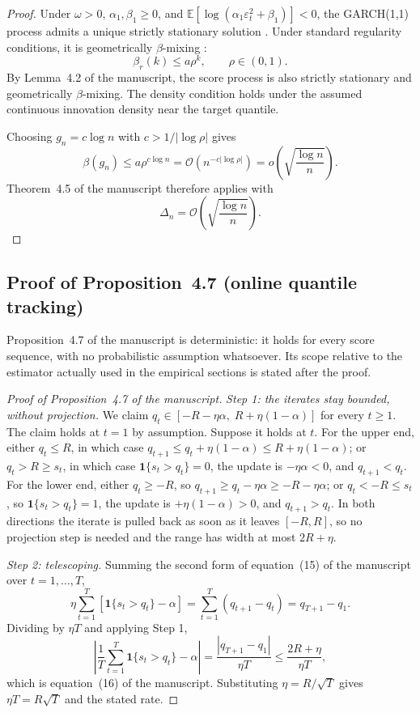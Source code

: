 \documentclass[preprint,11pt,authoryear]{elsarticle}
\newcommand{\1}{\boldsymbol{1}}
\begin{document}
\begin{proof}
	Under $\omega>0$, $\alpha_1,\beta_1\ge0$, and
	$\mathbb E[\log(\alpha_1\varepsilon_t^2+\beta_1)]<0$, the GARCH(1,1)
	process admits a unique strictly stationary solution
	\citep[Theorem~2.10]{francq2019garch}. Under standard regularity
	conditions, it is geometrically $\beta$-mixing
	\citep{francq2019garch,lindner2009stationarity}:
	\[
	\beta_r(k)\le a\rho^k,
	\qquad \rho\in(0,1).
	\]
	By Lemma~4.2 of the manuscript, the score process is also strictly
	stationary and geometrically $\beta$-mixing. The density condition holds
	under the assumed continuous innovation density near the target quantile.
	
	Choosing $g_n=c\log n$ with $c>1/|\log\rho|$ gives
	\begin{equation}
		\label{eq:app_garch_gap_rate}
		\beta(g_n)\le a\rho^{c\log n}
		=
		\mathcal O(n^{-c|\log\rho|})
		=
		o\!\left(\sqrt{\frac{\log n}{n}}\right).
	\end{equation}
	Theorem~4.5 of the manuscript therefore applies with
	\[
	\Delta_n
	=
	\mathcal O\!\left(\sqrt{\frac{\log n}{n}}\right).
	\]
\end{proof}

\subsection{Proof of Proposition~4.7 (online quantile tracking)}
\label{app:ogd_regret}

Proposition~4.7 of the manuscript is deterministic: it holds for every score
sequence, with no probabilistic assumption whatsoever. Its scope relative to the
estimator actually used in the empirical sections is stated after the proof.


\begin{proof}[Proof of Proposition~4.7 of the manuscript]
	\emph{Step 1: the iterates stay bounded, without projection.} We claim
	$q_t\in[-R-\eta\alpha,\;R+\eta(1-\alpha)]$ for every $t\ge1$. The claim
	holds at $t=1$ by assumption. Suppose it holds at $t$. For the upper end,
	either $q_t\le R$, in which case
	$q_{t+1}\le q_t+\eta(1-\alpha)\le R+\eta(1-\alpha)$; or $q_t>R\ge s_t$, in
	which case $\mathbf 1\{s_t>q_t\}=0$, the update is $-\eta\alpha<0$, and
	$q_{t+1}<q_t$. For the lower end, either $q_t\ge -R$, so
	$q_{t+1}\ge q_t-\eta\alpha\ge -R-\eta\alpha$; or $q_t<-R\le s_t$, so
	$\mathbf 1\{s_t>q_t\}=1$, the update is $+\eta(1-\alpha)>0$, and
	$q_{t+1}>q_t$. In both directions the iterate is pulled back as soon as it
	leaves $[-R,R]$, so no projection step is needed and the range has width at
	most $2R+\eta$.

	\emph{Step 2: telescoping.} Summing the second form of
	equation~(15) of the manuscript over $t=1,\ldots,T$,
	\[
	\eta\sum_{t=1}^{T}\left[\mathbf 1\{s_t>q_t\}-\alpha\right]
	=\sum_{t=1}^{T}\left(q_{t+1}-q_t\right)
	=q_{T+1}-q_1 .
	\]
	Dividing by $\eta T$ and applying Step 1,
	\[
	\left|\frac1T\sum_{t=1}^{T}\mathbf 1\{s_t>q_t\}-\alpha\right|
	=\frac{|q_{T+1}-q_1|}{\eta T}
	\le\frac{2R+\eta}{\eta T},
	\]
	which is equation~(16) of the manuscript. Substituting $\eta=R/\sqrt T$ gives
	$\eta T=R\sqrt T$ and the stated rate.
\end{proof}
\end{document}
